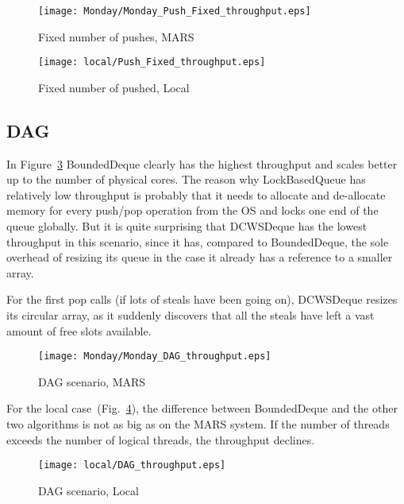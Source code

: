 \documentclass [10pt]{scrartcl}
\begin{document}
   
   \begin{figure}[h]
      \centering
      \texttt{[image: Monday/Monday\_Push\_Fixed\_throughput.eps]}
      \caption{Fixed number of pushes, MARS}
      \label{fig:push_fixed_mars}
   \end{figure}
   \clearpage
   \begin{figure}[t]
      \centering
      \texttt{[image: local/Push\_Fixed\_throughput.eps]}
      \caption{Fixed number of pushed, Local}
      \label{fig:push_fixed_local}
   \end{figure}
   
   
   
   \subsection{DAG}
   In Figure~\ref{fig:dag_mars}  BoundedDeque clearly has the highest throughput and scales better up to the number of physical cores. The reason why LockBasedQueue has relatively low throughput is probably that it needs to allocate and de-allocate memory for every push/pop operation from the OS and locks one end of the queue globally. But it is quite surprising that DCWSDeque has the lowest throughput in this scenario, since it has, compared to BoundedDeque, the sole overhead of resizing its queue in the case it already has a reference to a smaller array.
   
   For the first pop calls (if lots of steals have been going on), DCWSDeque resizes its circular array, as it suddenly discovers that all the steals have left a vast amount of free slots available. 
   
   \begin{figure}[h]
      \centering
      \texttt{[image: Monday/Monday\_DAG\_throughput.eps]}
      \caption{DAG scenario, MARS}
      \label{fig:dag_mars}
   \end{figure}
   
   For the local case~(Fig.~\ref{fig:dag_local}), the difference between BoundedDeque and the other two algorithms is not as big as on the MARS system. If the number of threads exceeds the number of logical threads, the throughput declines.
   
   
   \begin{figure}[h]
      \centering
      \texttt{[image: local/DAG\_throughput.eps]}
      \caption{DAG scenario, Local}
      \label{fig:dag_local}
   \end{figure}
   
\end{document}
